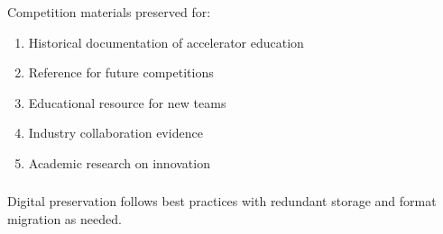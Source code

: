 \subsubsection{}
Competition materials preserved for:
\begin{enumerate}[noitemsep]
    \item Historical documentation of accelerator education
    \item Reference for future competitions
    \item Educational resource for new teams
    \item Industry collaboration evidence
    \item Academic research on innovation
\end{enumerate}

\subsubsection{}
Digital preservation follows best practices with redundant storage and format migration as needed.
